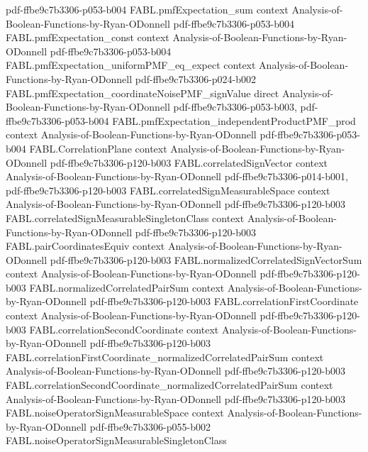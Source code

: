 \begin{theorem}
  {pdf-ffbe9c7b3306-p053-b004}
\proofstep
  {FABL.pmfExpectation_sum}
  {context}
  {Analysis-of-Boolean-Functions-by-Ryan-ODonnell}
  {pdf-ffbe9c7b3306-p053-b004}
\proofstep
  {FABL.pmfExpectation_const}
  {context}
  {Analysis-of-Boolean-Functions-by-Ryan-ODonnell}
  {pdf-ffbe9c7b3306-p053-b004}
\proofstep
  {FABL.pmfExpectation_uniformPMF_eq_expect}
  {context}
  {Analysis-of-Boolean-Functions-by-Ryan-ODonnell}
  {pdf-ffbe9c7b3306-p024-b002}
\proofstep
  {FABL.pmfExpectation_coordinateNoisePMF_signValue}
  {direct}
  {Analysis-of-Boolean-Functions-by-Ryan-ODonnell}
  {pdf-ffbe9c7b3306-p053-b003,
    pdf-ffbe9c7b3306-p053-b004}
\proofstep
  {FABL.pmfExpectation_independentProductPMF_prod}
  {context}
  {Analysis-of-Boolean-Functions-by-Ryan-ODonnell}
  {pdf-ffbe9c7b3306-p053-b004}
\proofstep
  {FABL.CorrelationPlane}
  {context}
  {Analysis-of-Boolean-Functions-by-Ryan-ODonnell}
  {pdf-ffbe9c7b3306-p120-b003}
\proofstep
  {FABL.correlatedSignVector}
  {context}
  {Analysis-of-Boolean-Functions-by-Ryan-ODonnell}
  {pdf-ffbe9c7b3306-p014-b001,
    pdf-ffbe9c7b3306-p120-b003}
\proofstep
  {FABL.correlatedSignMeasurableSpace}
  {context}
  {Analysis-of-Boolean-Functions-by-Ryan-ODonnell}
  {pdf-ffbe9c7b3306-p120-b003}
\proofstep
  {FABL.correlatedSignMeasurableSingletonClass}
  {context}
  {Analysis-of-Boolean-Functions-by-Ryan-ODonnell}
  {pdf-ffbe9c7b3306-p120-b003}
\proofstep
  {FABL.pairCoordinatesEquiv}
  {context}
  {Analysis-of-Boolean-Functions-by-Ryan-ODonnell}
  {pdf-ffbe9c7b3306-p120-b003}
\proofstep
  {FABL.normalizedCorrelatedSignVectorSum}
  {context}
  {Analysis-of-Boolean-Functions-by-Ryan-ODonnell}
  {pdf-ffbe9c7b3306-p120-b003}
\proofstep
  {FABL.normalizedCorrelatedPairSum}
  {context}
  {Analysis-of-Boolean-Functions-by-Ryan-ODonnell}
  {pdf-ffbe9c7b3306-p120-b003}
\proofstep
  {FABL.correlationFirstCoordinate}
  {context}
  {Analysis-of-Boolean-Functions-by-Ryan-ODonnell}
  {pdf-ffbe9c7b3306-p120-b003}
\proofstep
  {FABL.correlationSecondCoordinate}
  {context}
  {Analysis-of-Boolean-Functions-by-Ryan-ODonnell}
  {pdf-ffbe9c7b3306-p120-b003}
\proofstep
  {FABL.correlationFirstCoordinate_normalizedCorrelatedPairSum}
  {context}
  {Analysis-of-Boolean-Functions-by-Ryan-ODonnell}
  {pdf-ffbe9c7b3306-p120-b003}
\proofstep
  {FABL.correlationSecondCoordinate_normalizedCorrelatedPairSum}
  {context}
  {Analysis-of-Boolean-Functions-by-Ryan-ODonnell}
  {pdf-ffbe9c7b3306-p120-b003}
\proofstep
  {FABL.noiseOperatorSignMeasurableSpace}
  {context}
  {Analysis-of-Boolean-Functions-by-Ryan-ODonnell}
  {pdf-ffbe9c7b3306-p055-b002}
\proofstep
  {FABL.noiseOperatorSignMeasurableSingletonClass}

\end{theorem}
